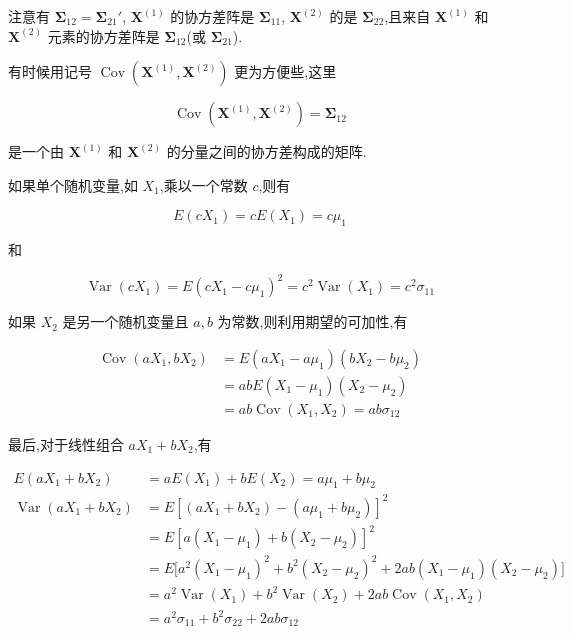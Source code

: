 
注意有 $\bm{\Sigma}_{12} = \bm{\Sigma}_{21}'$, $\bm{X}^{(1)}$ 的协方差阵是 $\bm{\Sigma}_{11}$, $\bm{X}^{(2)}$ 的是 $\bm{\Sigma}_{22}$,且来自 $\bm{X}^{(1)}$ 和 $\bm{X}^{(2)}$ 元素的协方差阵是 $\bm{\Sigma}_{12}$(或 $\bm{\Sigma}_{21}$).

有时候用记号 $\operatorname{Cov}(\bm{X}^{(1)},\bm{X}^{(2)})$ 更为方便些,这里

\[
\operatorname{Cov}(\bm{X}^{(1)},\bm{X}^{(2)}) = \bm{\Sigma}_{12}
\]

是一个由 $\bm{X}^{(1)}$ 和 $\bm{X}^{(2)}$ 的分量之间的协方差构成的矩阵.


如果单个随机变量,如 $X_1$,乘以一个常数 $c$,则有

\[
E(cX_1) = cE(X_1) = c\mu_1
\]

和

\[
\operatorname{Var}(cX_1) = E(cX_1 - c\mu_1)^2 = c^2\operatorname{Var}(X_1) = c^2\sigma_{11}
\]

如果 $X_2$ 是另一个随机变量且 $a, b$ 为常数,则利用期望的可加性,有

\begin{equation*}
\begin{aligned}
\operatorname{Cov}(aX_1,bX_2) &= E(aX_1 - a\mu_1)(bX_2 - b\mu_2) \\
&= abE(X_1 - \mu_1)(X_2 - \mu_2) \\
&= ab\operatorname{Cov}(X_1,X_2) = ab\sigma_{12}
\end{aligned}
\end{equation*}

最后,对于线性组合 $aX_1 + bX_2$,有

\label{eq:2-41}
\begin{equation}
\begin{aligned}
E(aX_1 + bX_2) &= aE(X_1) + bE(X_2) = a\mu_1 + b\mu_2 \\
\operatorname{Var}(aX_1 + bX_2) &= E[(aX_1 + bX_2) - (a\mu_1 + b\mu_2)]^2 \\
&= E[a(X_1 - \mu_1) + b(X_2 - \mu_2)]^2 \\
&= E\big[a^2(X_1 - \mu_1)^2 + b^2(X_2 - \mu_2)^2 + 2ab(X_1 - \mu_1)(X_2 - \mu_2)\big] \\
&= a^2\operatorname{Var}(X_1) + b^2\operatorname{Var}(X_2) + 2ab\operatorname{Cov}(X_1,X_2) \\
&= a^2\sigma_{11} + b^2\sigma_{22} + 2ab\sigma_{12}
\end{aligned} \tag{2-41}
\end{equation}

